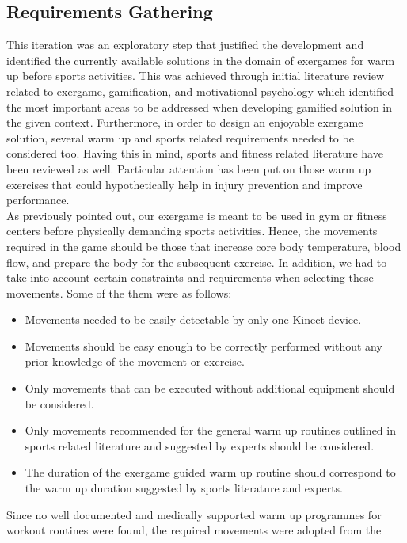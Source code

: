 \subsection{Requirements Gathering}
This iteration was an exploratory step that justified the development and identified the currently available solutions in the domain of exergames for warm up before sports activities. This was achieved through initial literature review related to exergame, gamification, and motivational psychology which identified the most important areas to be addressed when developing gamified solution in the given context. Furthermore, in order to design an enjoyable exergame solution, several warm up and sports related requirements needed to be considered too. Having this in mind, sports and fitness related literature have been reviewed as well. Particular attention has been put on those warm up exercises that could hypothetically help in injury prevention and improve performance. \\As previously pointed out, our exergame is meant to be used in gym or fitness centers before physically demanding sports activities. Hence, the movements required in the game should be those that increase core body temperature, blood flow, and prepare the body for the subsequent exercise. In addition, we had to take into account certain constraints and requirements when selecting these movements. Some of the them were as follows:
\begin{itemize}
\item Movements needed to be easily detectable by only one Kinect device.
\item Movements should be easy enough to be correctly performed without any prior knowledge of the movement or exercise.
\item Only movements that can be executed without additional equipment should be considered.   
\item Only movements recommended for the general warm up routines outlined in sports related literature and suggested by experts should be considered.
\item The duration of the exergame guided warm up routine should correspond to the warm up duration suggested by sports literature and experts.
\end{itemize}
Since no well documented and medically supported warm up programmes for workout routines were found,  the required movements were adopted from the 

